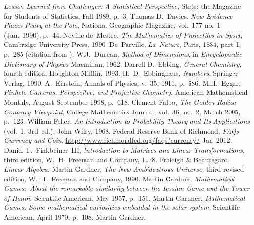 \begin{thebibliography}{\makebox[2em][c]{{}\hfil{}}}
  \emph{Lesson Learned from Challenger: A Statistical Perspective},
  Stats: the Magazine for Students of Statistics,
  Fall 1989,
  p.~3.
  Thomas D.~Davies,
  \emph{New Evidence Places Peary at the Pole},
  National Geographic Magazine,
  vol.~177 no.~1 (Jan.~1990),
  p.~44.
  Neville de~Mestre,
  \emph{The Mathematics of Projectiles in Sport},
  Cambridge University Press,
  1990.
 De~Parville,
 \emph{La~Nature},
 Paris, 1884,
 part~I,
 p.~285
 (citation from \cite{Ball}).
  W.J.~Duncan,
  \emph{Method of Dimensions},
  in
  \emph{Encyclopaedic Dictionary of Physics}
  Macmillan,
  1962.
  Darrell D.~Ebbing,
  \emph{General Chemistry},
  fourth edition,
  Houghton Mifflin,
  1993.
  H.\ D.\ Ebbinghaus,
  \emph{Numbers},
  Springer-Verlag,
  1990.
  A.~Einstein,
  Annals of Physics,
  v.~35, 1911,
  p.~686.
  M.H.~Eggar,
  \emph{Pinhole Cameras, Perspecitve, and Projective Geometry},
  American Mathematical Monthly,
  August-September 1998,
  p.~618.
  Clement Falbo,
  \emph{The Golden Ratio\Dash a Contrary Viewpoint},
  College Mathematics Journal,
  vol.~36, no.~2, March 2005,
  p.~123.
  William Feller,
  \emph{An Introduction to Probability Theory and Its Applications}
  (vol.~1, 3rd~ed.),
  John Wiley, 1968.
  Federal Reserve Bank of Richmond,
  \emph{FAQs Currency and Coin},
  \url{http://www.richmondfed.org/faqs/currency/}
  Jan~2012.
  Daniel T.\ Finkbeiner~III,
  \emph{Introduction to Matrices and Linear Transformations},
  third edition,
  W.\ H.\ Freeman and Company,
  1978.
  Fraleigh \& Beauregard,
  \emph{Linear Algebra}.
  Martin Gardner,
  \emph{The New Ambidextrous Universe},
  third revised edition,
  W.\ H.\ Freeman and Company,
  1990.
 Martin Gardner,
 \emph{Mathematical Games:~About the remarkable similarity between
   the Icosian Game and the Tower of Hanoi},
 Scientific American,
 May 1957,
 p.~150. 
  Martin Gardner,
  \emph{Mathematical Games, Some mathematical curiosities embedded in the
        solar system},
  Scientific American,
  April 1970,
  p.~108.
  Martin Gardner,

\end{thebibliography}
